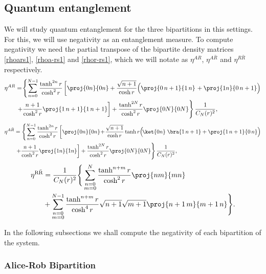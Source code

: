 \subsection{Quantum entanglement}\label{negatsec}

We will study quantum entanglement for the three bipartitions in this settings. For this, we will use negativity as an entanglement measure. To compute  negativity we need the partial transpose of the bipartite density matrices \eqref{rhoars1}, \eqref{rhoa-rs1} and \eqref{rhor-rs1}, which we will notate as $\eta^{AR}$, $\eta^{A\bar R}$ and $\eta^{R \bar R}$  respectively.
\begin{align}\label{etaARs}
\eta^{AR}&=\!\left\{\sum_{n=0}^{N-1}\frac{\tanh^{2n}r}{\cosh^2r}\left[\proj{0n}{0n}+\frac{\sqrt{n+1}}{\cosh r}\Big(\proj{0\,n+1}{1\, n}\right.\nonumber+\proj{1 n}{0\,n+1}\Big)\right.\nonumber\\*
&\left.\left.+\frac{n+1}{\cosh^2 r}\proj{1\,n+1}{1\,n+1}\right]+\frac{\tanh^{2N}r}{\cosh^2r}\proj{0N}{0N}\right\}\frac{1}{C_N(r)^2},
\end{align}
\begin{align}\label{etaAaRs}
\nonumber\eta^{A\bar R}&=\left\{\sum_{n=0}^{N-1}\frac{\tanh^{2n}r}{\cosh^2r}\left[\proj{0n}{0n}\!+\!\frac{\sqrt{n+1}}{\cosh r}\tanh r\Big(\!\ket{0n}\right.\bra{1\, n+1}+\proj{1\, n+1}{0\,n}\Big)\right.\nonumber\\*
&\left.\left.+\frac{n+1}{\cosh^2 r}\proj{1n}{1n}\right]+\frac{\tanh^{2N}r}{\cosh^2r}\proj{0N}{0N}\right\}\frac{1}{C_N(r)^2},
\end{align}
\begin{align}\label{etaRaRs}
\nonumber\eta^{\text{R}{\bar{\text{R}}}}&=\frac{1}{C_N(r)^2}\Bigg\{\sum_{\substack{n=0\\m=0}}^{N}\frac{\tanh^{n+m}r}{\cosh^2r}\proj{nm}{mn}\\
&+\sum_{\substack{n=0\\m=0}}^{N-1}\frac{\tanh^{n+m}r}{\cosh^4r}\sqrt{n+1}\sqrt{m+1}\proj{n+1\,m}{m+1\,n}\Bigg\}.
\end{align}

In the following subsections we shall compute the negativity of each bipartition of the system.
 
\subsubsection{Alice-Rob Bipartition}


